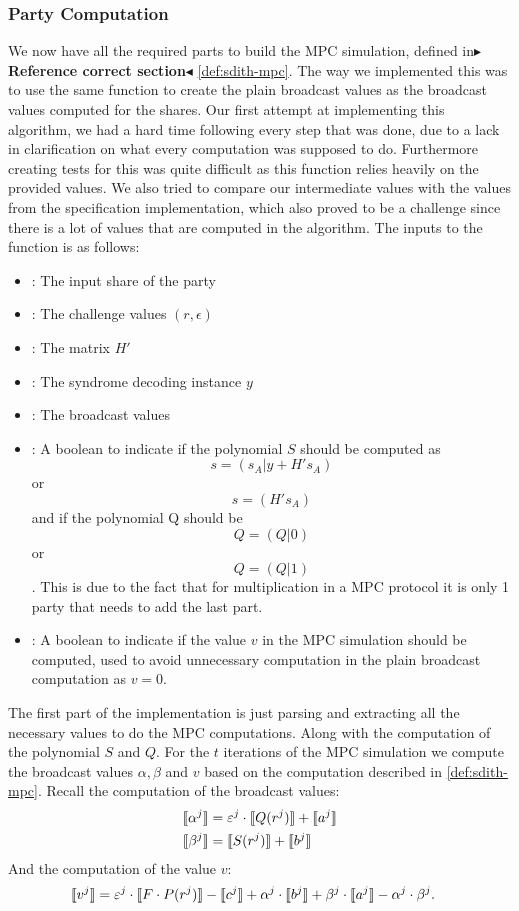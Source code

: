 \documentclass[11pt]{report}
\theoremstyle{definition}
\theoremstyle{plain}
\newcommand{\todo}[1]{{\color[rgb]{.5,0,0}\textbf{$\blacktriangleright$#1$\blacktriangleleft$}}}
\begin{document}
\subsubsection{Party Computation}
We now have all the required parts to build the MPC simulation, defined in\todo{Reference correct section} \autoref{def:sdith-mpc}. The way we implemented this was to use the same function to create the plain broadcast values as the broadcast values computed for the shares. Our first attempt at implementing this algorithm, we had a hard time following every step that was done, due to a lack in clarification on what every computation was supposed to do. Furthermore creating tests for this was quite difficult as this function relies heavily on the provided values. We also tried to compare our intermediate values with the values from the specification implementation, which also proved to be a challenge since there is a lot of values that are computed in the algorithm.
The inputs to the function is as follows:
\begin{itemize}
  \item {}: The input share of the party
  \item {}: The challenge values $(r, \epsilon)$
  \item {}: The matrix $H'$
  \item {}: The syndrome decoding instance $y$
  \item {}: The broadcast values
  \item {}: A boolean to indicate if the polynomial $S$ should be computed as $$s = (s_A|y+H's_A)$$ or $$s = (H's_A)$$ and if the polynomial Q should be $$Q = (Q|0)$$ or $$Q = (Q|1)$$. This is due to the fact that for multiplication in a MPC protocol it is only 1 party that needs to add the last part.
  \item {}: A boolean to indicate if the value $v$ in the MPC simulation should be computed, used to avoid unnecessary computation in the plain broadcast computation as $v = 0$.
\end{itemize}
The first part of the implementation is just parsing and extracting all the necessary values to do the MPC computations. Along with the computation of the polynomial $S$ and $Q$.
For the $t$ iterations of the MPC simulation we compute the broadcast values $\alpha, \beta$ and $v$ based on the computation described in \autoref{def:sdith-mpc}.
Recall the computation of the broadcast values:
\begin{align*}
  \llbracket \alpha^j \rrbracket & = \varepsilon^j \cdot \llbracket Q(r^j) \rrbracket + \llbracket a^j \rrbracket \\
  \llbracket \beta^j \rrbracket  & = \llbracket S(r^j) \rrbracket + \llbracket b^j \rrbracket                     \\
\end{align*}
And the computation of the value $v$:
\begin{align*}
  \llbracket v^j \rrbracket & = \varepsilon^j \cdot \llbracket F \cdot P(r^j) \rrbracket - \llbracket c^j \rrbracket + \alpha^j \cdot \llbracket b^j \rrbracket + \beta^j \cdot \llbracket a^j \rrbracket - \alpha^j \cdot \beta^j.
\end{align*}
\end{document}
